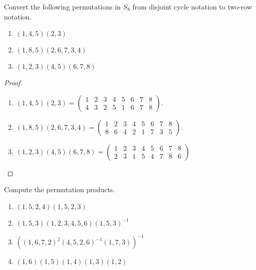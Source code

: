 \newpage
\begin{exercise}
    Convert the following permutations in $S_{8}$ from disjoint cycle notation to two-row notation.
    \begin{enumerate}[label={\textbf{\arabic*.}}]
        \item $(1, 4, 5)(2, 3)$
        \item $(1, 8, 5)(2, 6, 7, 3, 4)$
        \item $(1, 2, 3)(4, 5)(6, 7, 8)$
    \end{enumerate}
\end{exercise}

\begin{proof}
    \begin{enumerate}[label={\textbf{\arabic*.}}]
        \item $(1, 4, 5)(2, 3) = \begin{pmatrix}
                      1 & 2 & 3 & 4 & 5 & 6 & 7 & 8 \\
                      4 & 3 & 2 & 5 & 1 & 6 & 7 & 8
                  \end{pmatrix}$.
        \item $(1, 8, 5)(2, 6, 7, 3, 4) = \begin{pmatrix}
                      1 & 2 & 3 & 4 & 5 & 6 & 7 & 8 \\
                      8 & 6 & 4 & 2 & 1 & 7 & 3 & 5
                  \end{pmatrix}$.
        \item $(1, 2, 3)(4, 5)(6, 7, 8) = \begin{pmatrix}
                      1 & 2 & 3 & 4 & 5 & 6 & 7 & 8 \\
                      2 & 3 & 1 & 5 & 4 & 7 & 8 & 6
                  \end{pmatrix}$
    \end{enumerate}
\end{proof}

\newpage
\begin{exercise}
    Compute the permutation products.
    \begin{enumerate}[label={\textbf{\alph*.}}]
        \item $(1, 5, 2, 4)(1, 5, 2, 3)$
        \item $(1, 5, 3)(1, 2, 3, 4, 5, 6){(1, 5, 3)}^{-1}$
        \item ${({(1, 6, 7, 2)}^{2}{(4, 5, 2, 6)}^{-1}(1, 7, 3))}^{-1}$
        \item $(1, 6)(1, 5)(1, 4)(1, 3)(1, 2)$
    \end{enumerate}
\end{exercise}

